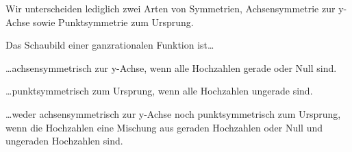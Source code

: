 Wir unterscheiden lediglich zwei Arten von Symmetrien, Achsensymmetrie zur y-Achse sowie Punktsymmetrie zum Ursprung.
\begin{tcolorbox}\centering
	\textcolor{loestc}{Das Schaubild einer ganzrationalen Funktion ist\dots}

	\textcolor{loestc}{\dots achsensymmetrisch zur y-Achse, wenn alle Hochzahlen gerade oder Null sind.}

	\textcolor{loestc}{\dots punktsymmetrisch zum Ursprung, wenn alle Hochzahlen ungerade sind.}

	\textcolor{loestc}{\dots weder achsensymmetrisch zur y-Achse noch punktsymmetrisch zum Ursprung, wenn die Hochzahlen eine Mischung aus geraden Hochzahlen oder Null und ungeraden Hochzahlen sind.}
\end{tcolorbox}

